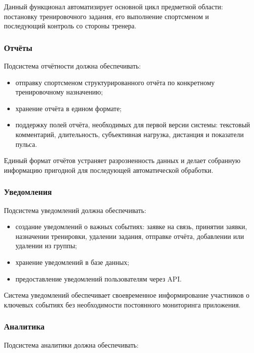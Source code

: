 Данный функционал автоматизирует основной цикл предметной области: постановку тренировочного задания, его выполнение спортсменом и последующий контроль со стороны тренера.

\subsubsection{Отчёты}

Подсистема отчётности должна обеспечивать:

\begin{itemize}
\tightlist
\item
  отправку спортсменом структурированного отчёта по конкретному тренировочному назначению;
\item
  хранение отчёта в едином формате;
\item
  поддержку полей отчёта, необходимых для первой версии системы: текстовый комментарий, длительность, субъективная нагрузка, дистанция и показатели пульса.
\end{itemize}

Единый формат отчётов устраняет разрозненность данных и делает собранную информацию пригодной для последующей автоматической обработки.

\subsubsection{Уведомления}

Подсистема уведомлений должна обеспечивать:

\begin{itemize}
\tightlist
\item
  создание уведомлений о важных событиях: заявке на связь, принятии заявки, назначении тренировки, удалении задания, отправке отчёта, добавлении или удалении из группы;
\item
  хранение уведомлений в базе данных;
\item
  предоставление уведомлений пользователям через API.
\end{itemize}

Система уведомлений обеспечивает своевременное информирование участников о ключевых событиях без необходимости постоянного мониторинга приложения.

\subsubsection{Аналитика}

Подсистема аналитики должна обеспечивать:

